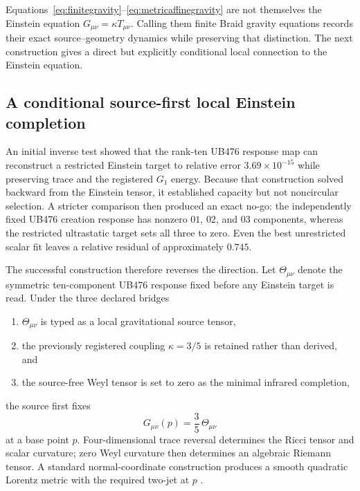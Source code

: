 \documentclass[11pt]{article}
\theoremstyle{definition}
\theoremstyle{remark}
\begin{document}
Equations~\eqref{eq:finitegravity}--\eqref{eq:metricaffinegravity} are not themselves the Einstein equation $G_{\mu\nu}=\kappa T_{\mu\nu}$. Calling them finite Braid gravity equations records their exact source--geometry dynamics while preserving that distinction. The next construction gives a direct but explicitly conditional local connection to the Einstein equation.

\subsection{A conditional source-first local Einstein completion}

An initial inverse test showed that the rank-ten UB476 response map can reconstruct a restricted Einstein target to relative error $3.69\times10^{-15}$ while preserving trace and the registered $G_1$ energy. Because that construction solved backward from the Einstein tensor, it established capacity but not noncircular selection. A stricter comparison then produced an exact no-go: the independently fixed UB476 creation response has nonzero $01$, $02$, and $03$ components, whereas the restricted ultrastatic target sets all three to zero. Even the best unrestricted scalar fit leaves a relative residual of approximately $0.745$.

The successful construction therefore reverses the direction. Let $\Theta_{\mu\nu}$ denote the symmetric ten-component UB476 response fixed before any Einstein target is read. Under the three declared bridges
\begin{enumerate}[label=(\roman*)]
\item $\Theta_{\mu\nu}$ is typed as a local gravitational source tensor,
\item the previously registered coupling $\kappa=3/5$ is retained rather than derived, and
\item the source-free Weyl tensor is set to zero as the minimal infrared completion,
\end{enumerate}
the source first fixes
\begin{equation}\label{eq:localEinstein}
 G_{\mu\nu}(p)=\frac35\,\Theta_{\mu\nu}
\end{equation}
at a base point $p$. Four-dimensional trace reversal determines the Ricci tensor and scalar curvature; zero Weyl curvature then determines an algebraic Riemann tensor. A standard normal-coordinate construction produces a smooth quadratic Lorentz metric with the required two-jet at $p$ \cite{wald1984}.
\end{document}
